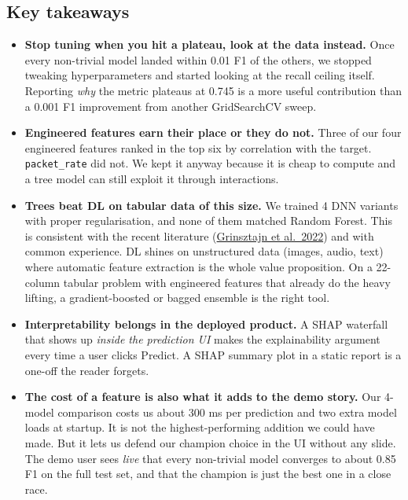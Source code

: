 \subsection{Key takeaways}\label{key-takeaways}

\begin{itemize}
\tightlist
\item
  \textbf{Stop tuning when you hit a plateau, look at the data instead.}
  Once every non-trivial model landed within 0.01 F1 of the others, we
  stopped tweaking hyperparameters and started looking at the recall
  ceiling itself. Reporting \emph{why} the metric plateaus at 0.745 is a
  more useful contribution than a 0.001 F1 improvement from another
  GridSearchCV sweep.
\item
  \textbf{Engineered features earn their place or they do not.} Three of
  our four engineered features ranked in the top six by correlation with
  the target. \texttt{packet\_rate} did not. We kept it anyway because
  it is cheap to compute and a tree model can still exploit it through
  interactions.
\item
  \textbf{Trees beat DL on tabular data of this size.} We trained 4 DNN
  variants with proper regularisation, and none of them matched Random
  Forest. This is consistent with the recent literature
  (\href{https://arxiv.org/abs/2207.08815}{Grinsztajn et al.~2022}) and
  with common experience. DL shines on unstructured data (images, audio,
  text) where automatic feature extraction is the whole value
  proposition. On a 22-column tabular problem with engineered features
  that already do the heavy lifting, a gradient-boosted or bagged
  ensemble is the right tool.
\item
  \textbf{Interpretability belongs in the deployed product.} A SHAP
  waterfall that shows up \emph{inside the prediction UI} makes the
  explainability argument every time a user clicks Predict. A SHAP
  summary plot in a static report is a one-off the reader forgets.
\item
  \textbf{The cost of a feature is also what it adds to the demo story.}
  Our 4-model comparison costs us about 300 ms per prediction and two
  extra model loads at startup. It is not the highest-performing
  addition we could have made. But it lets us defend our champion choice
  in the UI without any slide. The demo user sees \emph{live} that every
  non-trivial model converges to about 0.85 F1 on the full test set, and
  that the champion is just the best one in a close race.
\end{itemize}

